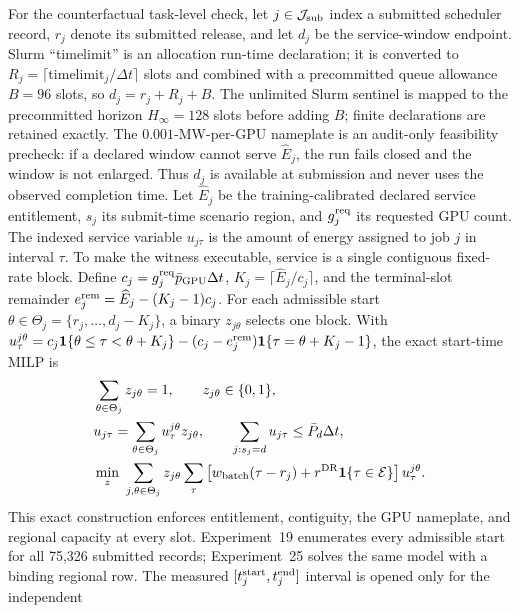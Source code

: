 \documentclass[10pt,journal]{IEEEtran}
\newcommand{\dt}{\Delta t}
\begin{document}
For the counterfactual task-level check, let \(j\in\mathcal J_{\rm sub}\) index a
submitted scheduler record, \(r_j\) denote its submitted release, and let
\(d_j\) be the service-window endpoint. Slurm ``timelimit'' is an allocation run-time
declaration; it is converted to \(R_j=\lceil\mathrm{timelimit}_j/\dt\rceil\)
slots and combined with a precommitted queue allowance \(B=96\) slots, so
\(d_j=r_j+R_j+B\). The unlimited Slurm sentinel is mapped to the precommitted
horizon \(H_{\infty}=128\) slots before adding \(B\); finite declarations are
retained exactly. The $0.001$-MW-per-GPU nameplate is an audit-only feasibility
precheck: if a declared window cannot serve \(\widehat E_j\), the run fails closed and the
window is not enlarged. Thus \(d_j\) is available at submission and never uses
the observed completion time. Let \(\widehat E_j\) be the training-calibrated
declared service entitlement, \(s_j\) its submit-time scenario region, and
\(g_j^{\rm req}\) its requested GPU count. The indexed service variable
\(u_{j\tau}\) is the amount of energy assigned to job \(j\) in interval
\(\tau\). To make the witness executable, service is a single contiguous
fixed-rate block. Define \(c_j=g_j^{\rm req}\bar p_{\rm GPU}\dt\),
\(K_j=\lceil\widehat E_j/c_j\rceil\), and the terminal-slot remainder
\(e_j^{\rm rem}=\widehat E_j-(K_j-1)c_j\). For each admissible start
\(\theta\in\Theta_j=\{r_j,\ldots,d_j-K_j\}\), a binary \(z_{j\theta}\)
selects one block. With
\(u^{j\theta}_{\tau}=c_j\mathbf1\{\theta\leq\tau<\theta+K_j\}
-(c_j-e_j^{\rm rem})\mathbf1\{\tau=\theta+K_j-1\}\), the exact start-time MILP is
\begin{equation}
\begin{aligned}
 &\sum_{\theta\in\Theta_j}z_{j\theta}=1,\qquad z_{j\theta}\in\{0,1\},\\
 &u_{j\tau}=\sum_{\theta\in\Theta_j}u^{j\theta}_{\tau}z_{j\theta},\qquad
   \sum_{j:s_j=d}u_{j\tau}\leq\bar P_d\dt,\\
 &\min_z\ \sum_{j,\theta\in\Theta_j}z_{j\theta}
   \sum_{\tau}\left[w_{\rm batch}(\tau-r_j)+r^{\rm DR}\mathbf1\{\tau\in\mathcal E\}\right]u^{j\theta}_{\tau}.
\end{aligned}
\label{eq:jobindexed}
\end{equation}
This exact construction enforces entitlement, contiguity, the GPU nameplate,
and regional capacity at every slot. Experiment~19 enumerates every admissible
start for all 75,326 submitted records; Experiment~25 solves the same model
with a binding regional row. The measured
\([t_j^{\rm start},t_j^{\rm end}]\) interval is opened only for the independent
\end{document}
